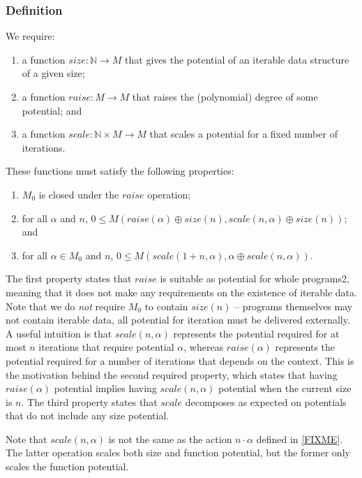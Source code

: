 \documentclass[acmsmall,review]{acmart}
\begin{document}
\subsubsection{Definition}
We require:
\begin{enumerate}
\item a function $\mathit{size} : \mathbb{N} \to M$ that gives the
  potential of an iterable data structure of a given
  size;
\item a function $\mathit{raise} : M \to M$ that raises the
  (polynomial) degree of some potential; and
\item a function $\mathit{scale} : \mathbb{N} \times M \to M$ that
  scales a potential for a fixed number of iterations.
\end{enumerate}
These functions must satisfy the following properties:
\begin{enumerate}
\item $M_0$ is closed under the $\mathit{raise}$ operation;
\item for all $\alpha$ and $n$,
  $0 \leq M(\mathit{raise}(\alpha) \oplus \mathit{size}(n),
  \mathit{scale}(n,\alpha) \oplus \mathit{size}(n))$; and
\item for all $\alpha \in M_0$ and $n$,
  $0 \leq M(\mathit{scale}(1 + n, \alpha), \alpha \oplus
  \mathit{scale}(n, \alpha))$.
\end{enumerate}
The first property states that $\mathit{raise}$ is suitable as
potential for whole programs2, meaning that it does not make any
requirements on the existence of iterable data. Note that we do
\emph{not} require $M_0$ to contain $\mathit{size}(n)$ -- programs
themselves may not contain iterable data, all potential for iteration
must be delivered externally. A useful intuition is that
$\mathit{scale}(n,\alpha)$ represents the potential required for at
most $n$ iterations that require potential $\alpha$, whereas
$\mathit{raise}(\alpha)$ represents the potential required for a
number of iterations that depends on the context. This is the
motivation behind the second required property, which states that
having $\mathit{raise}(\alpha)$ potential implies having
$\mathit{scale}(n,\alpha)$ potential when the current size is $n$. The
third property states that $\mathit{scale}$ decomposes as expected on
potentials that do not include any size potential.

Note that $\mathit{scale}(n,\alpha)$ is not the same as the action
$n \cdot \alpha$ defined in \autoref{FIXME}. The latter operation
scales both size and function potential, but the former only scales
the function potential.
\end{document}
